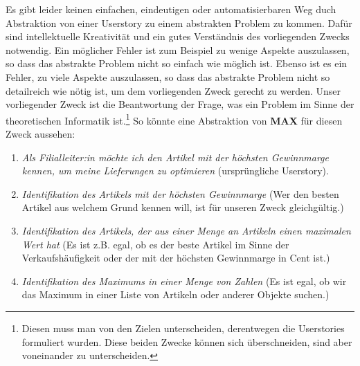 Es gibt leider keinen einfachen, eindeutigen oder automatisierbaren Weg
duch Abstraktion von einer Userstory zu einem abstrakten Problem zu kommen.
Dafür sind intellektuelle Kreativität
und ein gutes Verständnis des vorliegenden Zwecks notwendig.
Ein möglicher Fehler ist zum Beispiel zu wenige Aspekte auszulassen,
so dass das abstrakte Problem nicht so einfach wie möglich ist. 
Ebenso ist es ein Fehler, zu viele Aspekte auszulassen,
so dass das abstrakte Problem nicht so detailreich wie nötig ist,
um dem vorliegenden Zweck gerecht zu werden.
Unser vorliegender Zweck ist die Beantwortung der Frage,
was ein Problem im Sinne der theoretischen Informatik ist.\footnote{
    Diesen muss man von den Zielen unterscheiden,
    derentwegen die Userstories formuliert wurden.
    Diese beiden Zwecke können sich überschneiden,
    sind aber voneinander zu unterscheiden.
}
So könnte eine Abstraktion von \textbf{MAX} für diesen Zweck aussehen:
\begin{enumerate}
    \item \emph{Als Filialleiter:in möchte ich den Artikel mit der höchsten Gewinnmarge kennen,
        um meine Lieferungen zu optimieren} (ursprüngliche Userstory).
    \item \emph{Identifikation des Artikels mit der höchsten Gewinnmarge}
        (Wer den besten Artikel aus welchem Grund kennen will,
        ist für unseren Zweck gleichgültig.)
    \item \emph{Identifikation des Artikels,
        der aus einer Menge an Artikeln einen maximalen Wert hat}
        (Es ist z.B. egal,
        ob es der beste Artikel im Sinne der Verkaufshäufigkeit
        oder der mit der höchsten Gewinnmarge in Cent ist.)
    \item \emph{Identifikation des Maximums in einer Menge von Zahlen}
        (Es ist egal, ob wir das Maximum in einer Liste von Artikeln
        oder anderer Objekte suchen.)
\end{enumerate}

